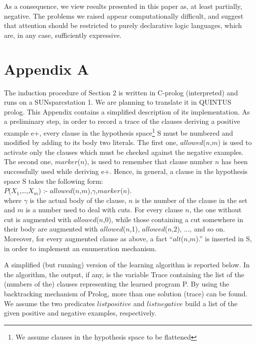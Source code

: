 As a consequence, we view results presented in this paper 
as, at least partially, negative.
The problems we raised appear computationally difficult, and
suggest that attention should be restricted to purely
declarative logic languages, which are, in any
case, sufficiently expressive.
 
 
 
\appendix
\section*{Appendix A}
 
The induction procedure of Section 2 is written in C-prolog 
(interpreted) and runs on a SUNsparcstation 1.
We are planning 
to translate it in QUINTUS prolog.
This Appendix contains a simplified description of its implementation.
As a preliminary step, in order
to record a trace of the clauses deriving a positive example e+, 
every clause in the 
hypothesis space\footnote{We assume clauses in the hypothesis space
to be flattened} S must be numbered and modified 
by adding to its body two literals.
The first one,
$allowed$($n$,$m$) is used to activate only the clauses which must be 
checked against
the negative examples.
The second one, $marker$($n$), is used to remember that clause number 
$n$ has been successfully used while deriving e+. 
Hence, in general, a clause in the hypothesis space S takes the following
form:\\
 
\noindent
$P$($X_1$,\ldots,$X_m$) :- $allowed$($n$,$m$),$\gamma$,$marker$($n$).\\
 
\noindent
where $\gamma$ is the actual body of the clause, $n$ is the
number of the clause in the set and $m$ is a number used to deal with cuts.
For every clause $n$, the one without cut is augmented with $allowed$($n$,0),
while those containing a cut somewhere in their body
are augmented with $allowed$($n$,1), $allowed$($n$,2), ..., and so on. 
Moreover, for every augmented clause as above, a fact ``$alt$($n$,$m$).''
is inserted in S, 
in order to implement an enumeration mechanism.
 
A simplified (but running) version  
of the learning algorithm is
reported below.  In the algorithm, the
output, if any, is the variable Trace containing the
list of the (numbers of the) clauses representing the learned program P. 
By using the backtracking mechanism of Prolog, 
more than one solution (trace) can be found.
We assume the two predicates $listpositive$ and $listnegative$
build a list of the given positive and negative examples, respectively.\\
 
